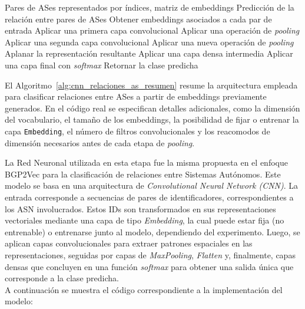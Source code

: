 \begin{algorithm}[H]
\caption{Clasificación de relaciones entre ASes usando una CNN sobre embeddings}
\label{alg:cnn_relaciones_as_resumen}
\begin{algorithmic}[1]
\Require Pares de ASes representados por índices, matriz de embeddings
\Ensure Predicción de la relación entre pares de ASes
\State Obtener embeddings asociados a cada par de entrada
\State Aplicar una primera capa convolucional
\State Aplicar una operación de \textit{pooling}
\State Aplicar una segunda capa convolucional
\State Aplicar una nueva operación de \textit{pooling}
\State Aplanar la representación resultante
\State Aplicar una capa densa intermedia
\State Aplicar una capa final con \textit{softmax}
\State Retornar la clase predicha
\end{algorithmic}
\end{algorithm}
El Algoritmo~\ref{alg:cnn_relaciones_as_resumen} resume la arquitectura empleada para clasificar relaciones entre ASes a partir de embeddings previamente generados. En el código real se especifican detalles adicionales, como la dimensión del vocabulario, el tamaño de los embeddings, la posibilidad de fijar o entrenar la capa \texttt{Embedding}, el número de filtros convolucionales y los reacomodos de dimensión necesarios antes de cada etapa de \textit{pooling}.




La Red Neuronal utilizada en esta etapa fue la misma propuesta en el enfoque BGP2Vec para la clasificación de relaciones entre Sistemas Autónomos. Este modelo se basa en una arquitectura de \textit{Convolutional Neural Network (CNN)}. La entrada corresponde a secuencias de pares de identificadores, correspondientes a los ASN involucrados. Estos IDs son transformados en sus representaciones vectoriales mediante una capa de tipo \textit{Embedding}, la cual puede estar fija (no entrenable) o entrenarse junto al modelo, dependiendo del experimento. Luego, se aplican capas convolucionales para extraer patrones espaciales en las representaciones, seguidas por capas de \textit{MaxPooling}, \textit{Flatten} y, finalmente, capas densas que concluyen en una función \textit{softmax} para obtener una salida única que corresponde a la clase predicha.\\

A continuación se muestra el código correspondiente a la implementación del modelo:\\





